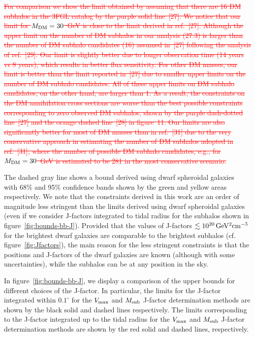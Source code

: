 \documentclass[12pt, a4paper]{article}
\newcommand{\old}[1]{\textcolor{red}{\st{#1}}}
\newcommand{\mdm}{{M_{\rm DM}}}
\begin{document}
\old{For comparison we show the limit obtained by assuming that there are 16 DM subhalos in the 3FGL catalog by the purple solid line~[27].
We notice that our limit for $\mdm = 30$~GeV 
is close to
the limit derived in ref.~[27]. Although the upper limit on the number of DM subhalos in our analysis (27.3) is larger than the number of DM subhalo candidates (16) assumed in~[27] following the analysis of ref.~[29].
Our limit is slightly better due to longer observation time (14 years vs 8 years), which results in better flux sensitivity.
For other DM masses, 
our limit is better than the limit reported in~[27] due to smaller upper limits on the number of DM subhalo candidates.
All of these upper limits on DM subhalo candidates, on the other hand, are larger than 1. As a result, the constraints on the DM annihilation cross sections are worse than the best possible constraints corresponding to zero observed DM subhalos, shown by the purple dash-dotted line~[27] and the orange dashed line~[28] in figure~11.
Our limits are also significantly better for most of DM masses than in ref.~[31] due to the very conservative approach in estimating the number of DM subhalos adopted in ref.~[31], where the number of possible DM subhalo candidates, e.g., for $\mdm = 30$~GeV is estimated to be 281 in the most conservative scenario.
}

{The dashed gray line shows} a bound derived using dwarf spheroidal galaxies~\cite{2024PhRvD.109f3024M} with 68\% and 95\% confidence bands {shown by the green and yellow areas respectively.}
We note that the constraints derived in this work are an order of magnitude less stringent than the limits derived using dwarf spheroidal galaxies (even if we consider J-factors integrated to tidal radius for the subhalos shown in figure~\ref{fig:bounds-bb-J}).
Provided that the values of J-factors $\lesssim 10^{20}\, {\rm GeV^2 cm^{-5}} $ for the brightest dwarf galaxies \citep{2024PhRvD.109f3024M} are comparable to the brightest subhalos (cf. figure~\ref{fig:Jfactors}), the main reason for the less stringent constraints is that the positions and J-factors of the dwarf galaxies are known (although with some uncertainties), while the subhalos can be at any position in the sky.

In figure~\ref{fig:bounds-bb-J}, we display a comparison of the upper bounds for different choices of the J-factor.
In particular, the limits for the J-factor integrated within $0.1^\circ$ for the $V_{\rm max}$ and $M_{\rm sub}$ J-factor
determination methods are shown by the black solid and dashed lines respectively. 
The limits corresponding to the J-factor integrated up to the tidal radius for 
the $V_{\rm max}$ and $M_{\rm sub}$ J-factor determination methods are shown by the red solid and dashed lines, respectively.
\end{document}
